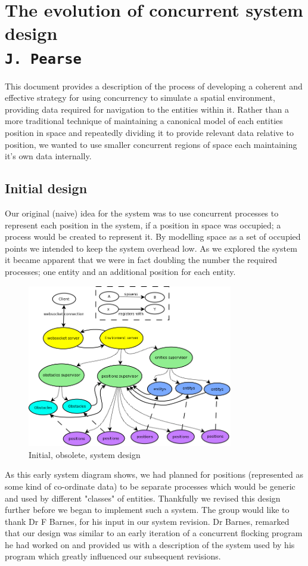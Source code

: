 \pagestyle{empty}

\section{The evolution of concurrent system design\\{\small\tt{J.~Pearse}}}
\label{system-design-document}
This document provides a description of the process of developing a coherent and effective strategy for using concurrency to simulate a spatial environment, providing data required for navigation to the entities within it.
Rather than a more traditional technique of maintaining a canonical model of each entities position in space and repeatedly dividing it to provide relevant data relative to position, we wanted to use smaller concurrent regions of space each maintaining it's own data internally.
\subsection{Initial design}
Our original (naive) idea for the system was to use concurrent processes to represent each position in the system, if a position in space was occupied; a process would be created to represent it. By modelling space as a set of occupied points we intended to keep the system overhead low. As we explored the system it became apparent that we were in fact doubling the number the required processes; one entity and an additional position for each entity.
\begin{figure}[h]
  \centering
  \includegraphics[width=0.8\textwidth]{img/HighLevelProcess.png}
\caption{Initial, obsolete, system design}
    \label{fig:Initial system design}
\end{figure}
As this early system diagram shows, we had planned for positions (represented as some kind of co-ordinate data) to be separate processes which would be generic and used by different "classes" of entities. Thankfully we revised this design further before we began to implement such a system.
The group would like to thank Dr F Barnes, for his input in our system revision. Dr Barnes, remarked that our design was similar to an early iteration of a concurrent flocking program he had worked on and provided us with a description of the system used by his program which greatly influenced our subsequent revisions.

